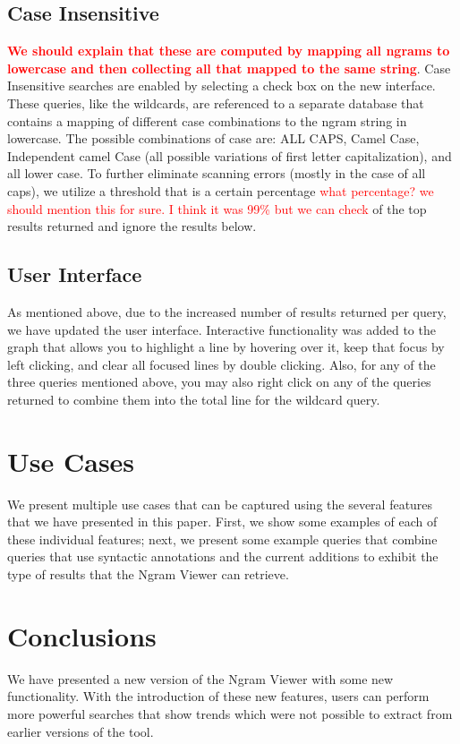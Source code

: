 \documentclass[11pt]{article}
\begin{document}
\subsection{Case Insensitive}
\textcolor{red}{\bf We should explain that these are computed by mapping all ngrams to lowercase and then collecting all that mapped to the same string}.
Case Insensitive searches are enabled by selecting a check box on the new interface. These queries, like the wildcards, are referenced to a separate database that contains a mapping of different case combinations to the ngram string in lowercase. The possible combinations of case are: ALL CAPS, Camel Case, Independent camel Case (all possible variations of first letter capitalization), and all lower case. To further eliminate scanning errors (mostly in the case of all caps), we utilize a threshold that is a certain percentage \textcolor{red}{what percentage? we should mention this for sure. I think it was 99\% but we can check}
of the top results returned and ignore the results below.



\subsection{User Interface}
\label{sec:userint}
As mentioned above, due to the increased number of results returned per query, we have updated the user interface. Interactive functionality was added to the graph that allows you to highlight a line by hovering over it, keep that focus by left clicking, and clear all focused lines by double clicking. Also, for any of the three queries mentioned above, you may also right click on any of the queries returned to combine them into the total line for the wildcard query.


\section{Use Cases}
\label{sec:usecases}
We present multiple use cases that can be captured using the several features that we have presented in this paper. First, we show some examples of each of these individual features; next, we present some example queries that combine queries that use syntactic annotations and the current additions to exhibit the type of results that the Ngram Viewer can retrieve.


\section{Conclusions}
We have presented a new version of the Ngram Viewer with some new functionality. With the introduction of these new features, users can perform more powerful searches that show trends which were not possible to extract from earlier versions of the tool. 
\end{document}
